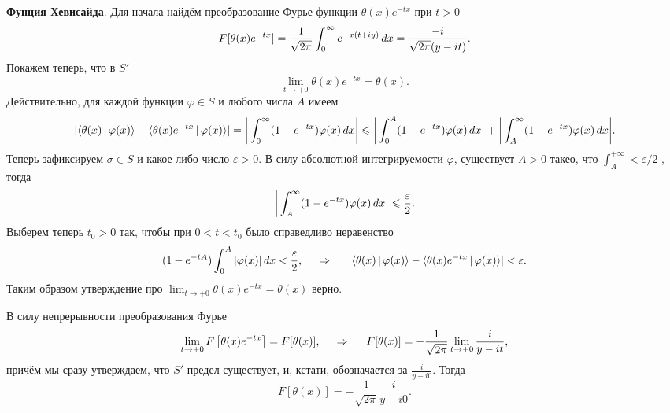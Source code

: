 \textbf{Фунция Хевисайда}. Для начала найдём преобразование Фурье функции $\theta(x) e^{-tx}$ при $t>0$
\begin{equation*}
    F[\theta(x) e^{-tx}] = \frac{1}{\sqrt{2\pi}} \int_{0}^{\infty} e^{-x(t+iy)}\, d x = \frac{-i}{\sqrt{2\pi} (y-it)}.
\end{equation*}
Покажем теперь, что в $S'$
\begin{equation*}
    \lim_{t\to+0} \theta(x) e^{-tx} = \theta(x).
\end{equation*}
Действительно, для каждой функции $\varphi \in S$ и любого числа $A$ имеем
\begin{equation*}
    |
        \langle \theta(x) \,|\, \varphi(x) \rangle - 
        \langle \theta(x) e^{-tx} \,|\, \varphi(x) \rangle 
    | = \bigg| \int_{0}^{\infty} (1-e^{-tx}) \varphi(x) \, d x \bigg| \leqslant 
    \bigg| \int_{0}^{A} (1-e^{-tx}) \varphi(x) \, d x \bigg| + 
    \bigg| \int_{A}^{\infty} (1-e^{-tx}) \varphi(x) \, d x \bigg|.
\end{equation*}
Теперь зафиксируем $\sigma \in S$ и какое-либо число $\varepsilon >0$. В силу абсолютной интегрируемости $\varphi$, существует $A > 0$ такео, что $\int_A^{+\infty} < \varepsilon/2$ , тогда
\begin{equation*}
    \bigg| \int_{A}^{\infty}  (1-e^{-tx}) \varphi(x) \, d x \bigg| \leqslant \frac{\varepsilon}{2}.
\end{equation*}
Выберем теперь $t_0 > 0$ так, чтобы при $0 < t < t_0$ было справедливо неравенство
\begin{equation*}
    (1 - e^{-t A}) \int_{0}^{A}  |\varphi(x)| \, d x < \frac{\varepsilon}{2},
    \hspace{0.5cm} \Rightarrow \hspace{0.5cm}
        |
        \langle \theta(x) \,|\, \varphi(x) \rangle - 
        \langle \theta(x) e^{-tx} \,|\, \varphi(x) \rangle 
    | < \varepsilon.
\end{equation*}
Таким образом утверждение про $\lim_{t\to+0} \theta(x) e^{-tx} = \theta(x)$ верно. 


В силу непрерывности преобразования Фурье
\begin{equation*}
    \lim_{t\to +0} F\left[
        \theta(x) e^{-tx}
    \right] = F[\theta(x)],
    \hspace{0.5cm} \Rightarrow \hspace{0.5cm}
    F[\theta(x)] = -\frac{1}{\sqrt{2\pi}} \lim_{t\to +0} \frac{i}{y-it},
\end{equation*}
причём  мы сразу утверждаем, что $S'$ предел существует, и, кстати, обозначается за $\frac{i}{y-i 0}$. Тогда
\begin{equation*}
    F[\theta(x)] = - \frac{1}{\sqrt{2\pi}} \frac{i}{y-i0}.
\end{equation*}